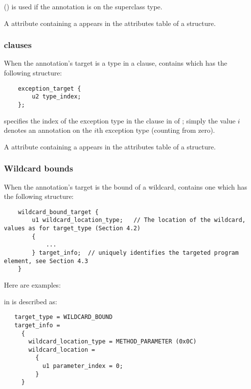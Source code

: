 \documentclass[10pt]{article}
\begin{document}
 () is used if the annotation is on the superclass type.

A \RuntimeInOrVisibleTypeAnnotations attribute containing a
 appears in the attributes table of a
 structure.


\subsubsection{ clauses\label{class-file:ext:ri:throws}}
When the annotation's target is a type in a  clause,
 contains  which has the
following structure:

\begin{Verbatim}
    exception_target {
        u2 type_index;
    };
\end{Verbatim}

 specifies the index of the exception type in the
clause in  of ;
simply the value $i$ denotes an annotation on the $i$th exception
type (counting from zero).

A \RuntimeInOrVisibleTypeAnnotations attribute containing a
 appears in the attributes table of a
 structure.


\subsubsection{Wildcard bounds\label{class-file:ext:ri:wildcard}}

When the annotation's target is the bound of a wildcard,
 contains one  which
has the following structure:

\begin{Verbatim}
    wildcard_bound_target {
        u1 wildcard_location_type;   // The location of the wildcard, values as for target_type (Section 4.2)
        {
            ...
        } target_info;  // uniquely identifies the targeted program element, see Section 4.3
    }
\end{Verbatim}

Here are examples:

\noindent
{} in  is described as:

\begin{Verbatim}
   target_type = WILDCARD_BOUND
   target_info =
     {
       wildcard_location_type = METHOD_PARAMETER (0x0C)
       wildcard_location =
         {
           u1 parameter_index = 0;
         }
     }
\end{Verbatim}
\end{document}
